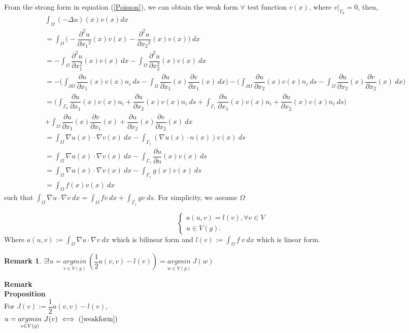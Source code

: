 \documentclass[]{report}
\newtheorem{remark}{Remark}[section]
\begin{document}
From the strong form in equation (\ref{Poisson}), we can obtain the weak form
$ \forall $ test function $ v(x) $, where $ v|_{\Gamma_0} = 0 $, then,
\begin{align*}
	&\int_\Omega (-\Delta u)(x) v(x) dx\\
	&= \int_\Omega \Big(-\dfrac{\partial^2u}{\partial{x_1}^2} (x) v(x) -\dfrac{\partial^2u}{\partial{x_2}^2} (x) v(x) \Big) \ dx \\
	&= - \int_{\Omega} \dfrac{\partial^{2}u}{\partial x_{1}^{2}}  (x) v(x) \ dx - \int_{\Omega} \dfrac{\partial^{2} u}{\partial x_{2}^{2}} (x) v(x) \ dx\\
	&= - \Big( \int_{\partial \Omega} \dfrac{\partial u}{\partial x_{1}} (x) v(x) n_{i} \ ds - \int_{\Omega} \dfrac{\partial u}{\partial x_{1}} (x) \dfrac{\partial v}{\partial x_{1}} (x) \ dx \Big) - \Big( \int_{\partial \Omega} \dfrac{\partial u}{\partial x_{2}} (x) v(x) n_{i} \ ds - \int_{\Omega} \dfrac{\partial u}{\partial x_{2}} (x) \dfrac{\partial v}{\partial x_{2}} (x) \ dx \Big)\\
	&= \Big( \int_{\Gamma_0} \dfrac{\partial u}{\partial x_{1}} (x) v(x) n_{i} + \dfrac{\partial u}{\partial x_{2}} (x) v(x) n_{i} \ ds + \int_{\Gamma_1} \dfrac{\partial u}{\partial x_{1}} (x) v(x) n_{i} + \dfrac{\partial u}{\partial x_{2}} (x) v(x) n_{i} \ ds \Big) \\
	&+ \int_{\Omega} \dfrac{\partial u}{\partial x_{1}} (x) \dfrac{\partial v}{\partial x_{1}} (x) + \dfrac{\partial u}{\partial x_{2}} (x) \dfrac{\partial v}{\partial x_{2}} (x) \ dx \\
	&= \int_{\Omega} \nabla u(x) \cdot \nabla v(x) \ dx - \int_{\Gamma_1} (\nabla u(x) \cdot n(x)) v(x) \ ds \\
	&= \int_{\Omega} \nabla u(x) \cdot \nabla v(x) \ dx - \int_{\Gamma_1} \dfrac{\partial u}{\partial n} (x) v(x) \ ds \\
	&= \int_{\Omega} \nabla u(x) \cdot \nabla v(x) \ dx - \int_{\Gamma_1} g(x) v(x) \ ds\\
	&= \int_{\Omega} f(x) v(x) \ dx
\end{align*}
such that $ \int_{\Omega} \nabla u \cdot \nabla v \ dx = \int_{\Omega} f v \ dx + \int_{\Gamma_1} g v \ ds $. For simplicity, we assume $ \Omega $

\begin{equation}\label{weakform}
\begin{cases}
a(u,v) = l(v), \forall v \in V \\
u \in V(g).
\end{cases}
\end{equation}
Where $ a(u,v) := \int_{\Omega} \nabla u \cdot \nabla v \ dx$ which is bilinear form and $ l(v) := \int_{\Omega} f \ v \ dx $ which is linear form.
\begin{remark}
	$ \exists ! u = \underset{v \in V(g)}{argmin} \ (\dfrac{1}{2} a(v,v)-l(v)) = \underset{w \in V(g)}{argmin} \ J(w)$
\end{remark}
\textbf{Remark}\\
\textbf{Proposition}\\
For $ J(v) := \dfrac{1}{2} a(v,v) -l (v) $,\\
$ u = \underset{v \in V(g)}{argmin} \ J(v) \iff (\ref{weakform}) $
\end{document}
